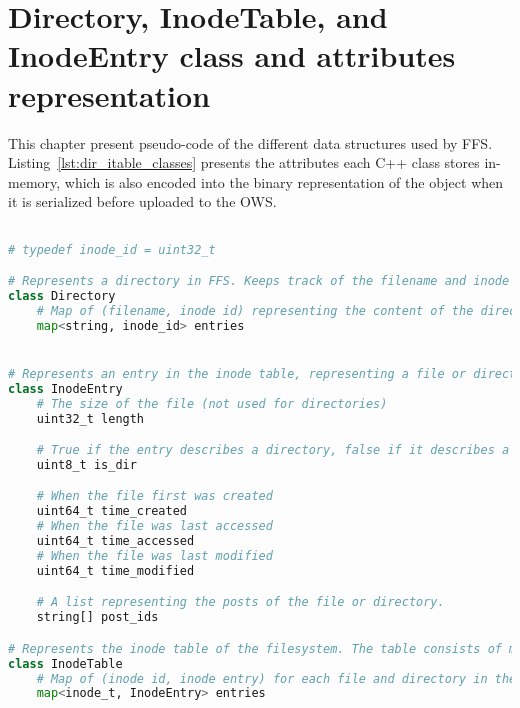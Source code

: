 \chapter{Directory, InodeTable, and InodeEntry class and attributes representation}
This chapter present pseudo-code of the different data structures used by FFS. Listing~\ref{lst:dir_itable_classes} presents the attributes each C++ class stores in-memory, which is also encoded into the binary representation of the object when it is serialized before uploaded to the OWS.

\label{app:inode_dir_code}
\begin{lstlisting}[language=python, caption={The attributes classes representing directories and the inode table in FFS}, label=lst:dir_itable_classes,breaklines=true]

# typedef inode_id = uint32_t

# Represents a directory in FFS. Keeps track of the filename and inode of each file
class Directory
	# Map of (filename, inode id) representing the content of the directory
	map<string, inode_id> entries


# Represents an entry in the inode table, representing a file or directory
class InodeEntry
	# The size of the file (not used for directories) 
	uint32_t length

	# True if the entry describes a directory, false if it describes a file
	uint8_t is_dir

	# When the file first was created
	uint64_t time_created
	# When the file was last accessed
	uint64_t time_accessed
	# When the file was last modified
	uint64_t time_modified

	# A list representing the posts of the file or directory. 
	string[] post_ids

# Represents the inode table of the filesystem. The table consists of multiple inode entries
class InodeTable
	# Map of (inode id, inode entry) for each file and directory in the filesystem
	map<inode_t, InodeEntry> entries

\end{lstlisting}